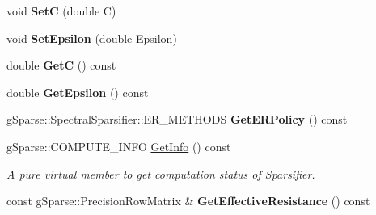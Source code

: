 \begin{DoxyCompactItemize}
\mbox{\label{classg_sparse_1_1_spectral_sparsifier_1_1_e_r_sampling_a35bf03bbda2e0d37345ce8d460e734a4}} 
void {\bfseries SetC} (double C)
\item 
\mbox{\label{classg_sparse_1_1_spectral_sparsifier_1_1_e_r_sampling_a57eceac9af3b8846c3370eca999a9a57}} 
void {\bfseries Set\+Epsilon} (double Epsilon)
\item 
\mbox{\label{classg_sparse_1_1_spectral_sparsifier_1_1_e_r_sampling_abd617a6dacb79fda563caf6509972667}} 
double {\bfseries GetC} () const
\item 
\mbox{\label{classg_sparse_1_1_spectral_sparsifier_1_1_e_r_sampling_a57a513740f9eff3113b518132c60cb0a}} 
double {\bfseries Get\+Epsilon} () const
\item 
\mbox{\label{classg_sparse_1_1_spectral_sparsifier_1_1_e_r_sampling_a9db84943ae4c2ff370ef59bcdc5c255c}} 
g\+Sparse\+::\+Spectral\+Sparsifier\+::\+E\+R\+\_\+\+M\+E\+T\+H\+O\+DS {\bfseries Get\+E\+R\+Policy} () const
\item 
\mbox{\label{classg_sparse_1_1_spectral_sparsifier_1_1_e_r_sampling_a898a55838f700015cdfa999b2b0fabe8}} 
g\+Sparse\+::\+C\+O\+M\+P\+U\+T\+E\+\_\+\+I\+N\+FO \mbox{\hyperlink{classg_sparse_1_1_spectral_sparsifier_1_1_e_r_sampling_a898a55838f700015cdfa999b2b0fabe8}{Get\+Info}} () const
\begin{DoxyCompactList}\small\item\em A pure virtual member to get computation status of Sparsifier. \end{DoxyCompactList}\item 
\mbox{\label{classg_sparse_1_1_spectral_sparsifier_1_1_e_r_sampling_a4b0ef0dc57feea2b927c86d1cd422273}} 
const g\+Sparse\+::\+Precision\+Row\+Matrix \& {\bfseries Get\+Effective\+Resistance} () const
\end{DoxyCompactItemize}
